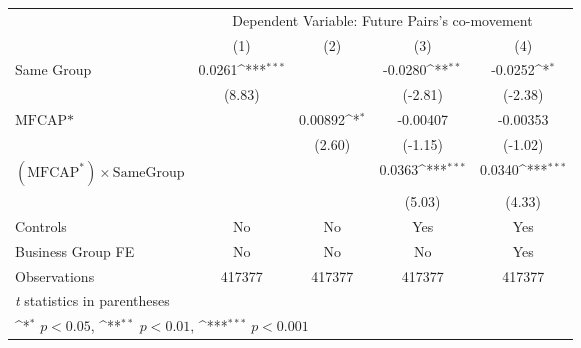 {
\def\sym#1{\ifmmode^{#1}\else\(^{#1}\)\fi}
\begin{tabular}{l*{4}{c}}
\hline\hline
                &\multicolumn{4}{c}{Dependent Variable: Future Pairs's co-movement}         \\\cmidrule(lr){2-5}
                &\multicolumn{1}{c}{(1)}         &\multicolumn{1}{c}{(2)}         &\multicolumn{1}{c}{(3)}         &\multicolumn{1}{c}{(4)}         \\
\hline
Same Group      &   0.0261\sym{***}&                  &  -0.0280\sym{**} &  -0.0252\sym{*}  \\
                &   (8.83)         &                  &  (-2.81)         &  (-2.38)         \\
[1em]
$ \text{MFCAP*} $&                  &  0.00892\sym{*}  & -0.00407         & -0.00353         \\
                &                  &   (2.60)         &  (-1.15)         &  (-1.02)         \\
[1em]
 $ (\text{MFCAP}^*) \times {\text{SameGroup} }  $ &                  &                  &   0.0363\sym{***}&   0.0340\sym{***}\\
                &                  &                  &   (5.03)         &   (4.33)         \\
\hline
Controls        &       No         &       No         &      Yes         &      Yes         \\
Business Group FE&       No         &       No         &       No         &      Yes         \\
Observations    &   417377         &   417377         &   417377         &   417377         \\
\hline\hline
\multicolumn{5}{l}{\footnotesize \textit{t} statistics in parentheses}\\
\multicolumn{5}{l}{\footnotesize \sym{*} \(p<0.05\), \sym{**} \(p<0.01\), \sym{***} \(p<0.001\)}\\
\end{tabular}
}
